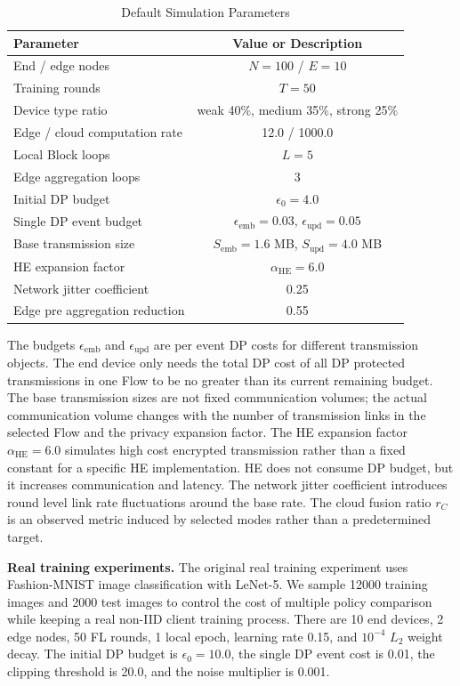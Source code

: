 ﻿\documentclass[preprint,12pt]{elsarticle}
\theoremstyle{plain}
\theoremstyle{definition}
\theoremstyle{remark}
\begin{document}
\begin{table}[t]
\centering
\caption{Default Simulation Parameters}
\label{tab:sim_params}
\begin{tabular}{lc}
\hline
\textbf{Parameter} & \textbf{Value or Description} \\
\hline
End / edge nodes & \(N=100\) / \(E=10\) \\
Training rounds & \(T=50\) \\
Device type ratio & weak 40\%, medium 35\%, strong 25\% \\
Edge / cloud computation rate & 12.0 / 1000.0 \\
Local Block loops & \(L=5\) \\
Edge aggregation loops & 3 \\
Initial DP budget & \(\epsilon_0=4.0\) \\
Single DP event budget & \(\epsilon_{\mathrm{emb}}=0.03\), \(\epsilon_{\mathrm{upd}}=0.05\) \\
Base transmission size & \(S_{\mathrm{emb}}=1.6\) MB, \(S_{\mathrm{upd}}=4.0\) MB \\
HE expansion factor & \(\alpha_{\mathrm{HE}}=6.0\) \\
Network jitter coefficient & 0.25 \\
Edge pre aggregation reduction & 0.55 \\
\hline
\end{tabular}
\end{table}

The budgets \(\epsilon_{\mathrm{emb}}\) and \(\epsilon_{\mathrm{upd}}\) are per event DP costs for different transmission objects.
The end device only needs the total DP cost of all DP protected transmissions in one Flow to be no greater than its current remaining budget.
The base transmission sizes are not fixed communication volumes; the actual communication volume changes with the number of transmission links in the selected Flow and the privacy expansion factor.
The HE expansion factor \(\alpha_{\mathrm{HE}}=6.0\) simulates high cost encrypted transmission rather than a fixed constant for a specific HE implementation.
HE does not consume DP budget, but it increases communication and latency.
The network jitter coefficient introduces round level link rate fluctuations around the base rate.
The cloud fusion ratio \(r_C\) is an observed metric induced by selected modes rather than a predetermined target.

\textbf{Real training experiments.}
The original real training experiment uses Fashion-MNIST image classification with LeNet-5.
We sample 12000 training images and 2000 test images to control the cost of multiple policy comparison while keeping a real non-IID client training process.
There are 10 end devices, 2 edge nodes, 50 FL rounds, 1 local epoch, learning rate 0.15, and \(10^{-4}\) \(L_2\) weight decay.
The initial DP budget is \(\epsilon_0=10.0\), the single DP event cost is 0.01, the clipping threshold is 20.0, and the noise multiplier is 0.001.
\end{document}
